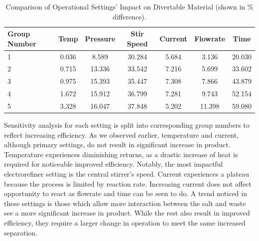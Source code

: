 \begin{table}[h]
	\centering
	\begin{tabularx}{\linewidth}{lcccccc}
		\hline
		\textbf{Group Number} & \textbf{Temp} & \textbf{Pressure} & \textbf{Stir Speed} & \textbf{Current}
		& \textbf{Flowrate} & \textbf{Time} \\
		\hline \hline
		1 & 0.036 & 8.589 & 30.284 & 5.684 & 3.136 & 20.030 \\ \hline
		2 & 0.715 & 13.336 & 33.542 & 7.216 & 5.699 & 33.602 \\ \hline
		3 & 0.975 & 15.393 & 35.447 & 7.308 & 7.866 & 43.879 \\ 
		4 & 1.672 & 15.912 & 36.799 & 7.281 & 9.743 & 52.154 \\ \hline
		5 & 3.328 & 16.047 & 37.848 & 5.202 & 11.398 & 59.080 \\ \hline
	\end{tabularx}
	\caption {Comparison of Operational Settings' Impact on Divertable Material (shown in
		\% difference).}
	\label {tab:compare}
\end{table}

Sensitivity analysis for each setting is split into corresponding group numbers to reflect increasing efficiency. As we observed earlier, temperature and current, although primary settings, 
do not result in significant increase in product. Temperature experiences diminishing returns, as a drastic increase of heat is required for noticeable improved efficiency. Notably,
the most impactful electrorefiner setting is the central stirrer's speed.  Current
experiences a plateau because the process is limited by reaction rate. Increasing current does not affect opportunity to react as flowrate and time can be seen to do. 
A trend noticed in these settings is those which allow more interaction between the salt and waste see a more significant increase in product. While the rest also result in
improved efficiency, they require a larger change in operation to meet the same increased separation.